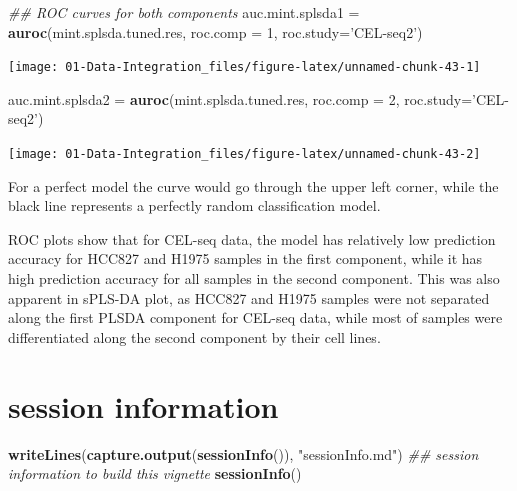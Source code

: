 \documentclass[]{book}
\newenvironment{Shaded}{\begin{snugshade}}{\end{snugshade}}
\newcommand{\CommentTok}[1]{\textcolor[rgb]{0.56,0.35,0.01}{\textit{#1}}}
\newcommand{\DataTypeTok}[1]{\textcolor[rgb]{0.13,0.29,0.53}{#1}}
\newcommand{\DecValTok}[1]{\textcolor[rgb]{0.00,0.00,0.81}{#1}}
\newcommand{\KeywordTok}[1]{\textcolor[rgb]{0.13,0.29,0.53}{\textbf{#1}}}
\newcommand{\NormalTok}[1]{#1}
\newcommand{\StringTok}[1]{\textcolor[rgb]{0.31,0.60,0.02}{#1}}
\theoremstyle{definition}
\theoremstyle{definition}
\theoremstyle{definition}
\theoremstyle{remark}
\begin{document}
\begin{Shaded}
\begin{Highlighting}[]
\CommentTok{## ROC curves for both components}
\NormalTok{auc.mint.splsda1 =}\StringTok{ }\KeywordTok{auroc}\NormalTok{(mint.splsda.tuned.res, }\DataTypeTok{roc.comp =} \DecValTok{1}\NormalTok{, }\DataTypeTok{roc.study=}\StringTok{'CEL-seq2'}\NormalTok{)}
\end{Highlighting}
\end{Shaded}

\begin{center}\texttt{[image: 01-Data-Integration\_files/figure-latex/unnamed-chunk-43-1]} \end{center}

\begin{Shaded}
\begin{Highlighting}[]
\NormalTok{auc.mint.splsda2 =}\StringTok{ }\KeywordTok{auroc}\NormalTok{(mint.splsda.tuned.res, }\DataTypeTok{roc.comp =} \DecValTok{2}\NormalTok{, }\DataTypeTok{roc.study=}\StringTok{'CEL-seq2'}\NormalTok{)}
\end{Highlighting}
\end{Shaded}

\begin{center}\texttt{[image: 01-Data-Integration\_files/figure-latex/unnamed-chunk-43-2]} \end{center}

For a perfect model the curve would go through the upper left corner,
while the black line represents a perfectly random classification model.

ROC plots show that for CEL-seq data, the model has relatively low
prediction accuracy for HCC827 and H1975 samples in the first component,
while it has high prediction accuracy for all samples in the second
component. This was also apparent in sPLS-DA plot, as HCC827 and H1975
samples were not separated along the first PLSDA component for CEL-seq
data, while most of samples were differentiated along the second
component by their cell lines.

\hypertarget{session-information}{%
\section{session information}\label{session-information}}

\begin{Shaded}
\begin{Highlighting}[]
\KeywordTok{writeLines}\NormalTok{(}\KeywordTok{capture.output}\NormalTok{(}\KeywordTok{sessionInfo}\NormalTok{()), }\StringTok{"sessionInfo.md"}\NormalTok{)}
\CommentTok{## session information to build this vignette}
\KeywordTok{sessionInfo}\NormalTok{()}
\end{Highlighting}
\end{Shaded}
\end{document}
